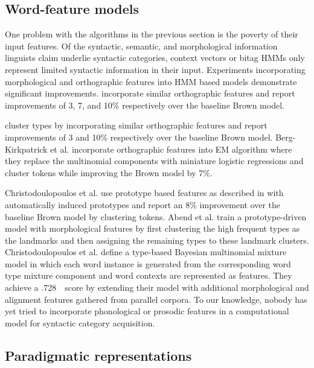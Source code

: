 \subsection{Word-feature models}
One problem with the algorithms in the previous section is the poverty
of their input features.  Of the syntactic, semantic, and
morphological information linguists claim underlie syntactic
categories, context vectors or bitag HMMs only represent limited
syntactic information in their input.  Experiments incorporating
morphological and orthographic features into HMM based models
demonstrate significant improvements.
\cite{Clark:2003:CDM:1067807.1067817,bergkirkpatrick-klein:2010:ACL,blunsom-cohn:2011:ACL-HLT2011}
incorporate similar orthographic features and report improvements of
3, 7, and 10\% respectively over the baseline Brown model.

\cite{Clark:2003:CDM:1067807.1067817,blunsom-cohn:2011:ACL-HLT2011}
cluster types by incorporating similar orthographic features and
report improvements of 3 and 10\% respectively over the baseline Brown
model.  Berg-Kirkpatrick et al. incorporate orthographic features into
EM algorithm where they replace the multinomial components with
miniature logistic regressions and cluster tokens while improving the
Brown model by 7\%.

Christodoulopoulos et
al.  use
prototype based features as described in
\cite{Haghighi:2006:PLS:1220835.1220876} with automatically induced
prototypes and report an 8\% improvement over the baseline Brown model
by clustering tokens.  Abend et
al.  train a
prototype-driven model with morphological features by first clustering
the high frequent types as the landmarks and then assigning the
remaining types to these landmark clusters.  Christodoulopoulos et
al. 
define a type-based Bayesian multinomial mixture model in which each
word instance is generated from the corresponding word type mixture
component and word contexts are represented as features.  They achieve
a .728\ \mto\ score by extending their model with additional
morphological and alignment features gathered from parallel corpora.
To our knowledge, nobody has yet tried to incorporate phonological or
prosodic features in a computational model for syntactic category
acquisition.

\subsection{Paradigmatic representations}

